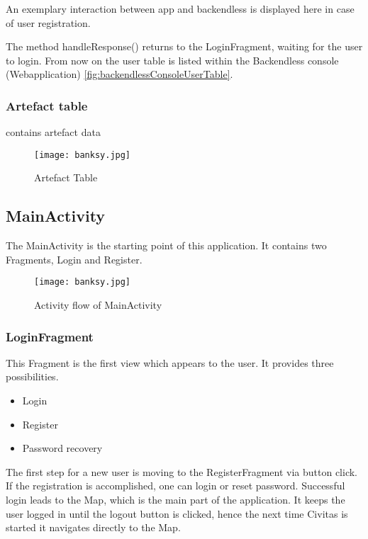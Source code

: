 An exemplary interaction between app and backendless is displayed here in case of user registration.

\fbox{

}

The method handleResponse() returns to the LoginFragment, waiting for the user to login. From now on the user table is listed within the Backendless console (Webapplication) \ref{fig:backendlessConsoleUserTable}.


\subsubsection{Artefact table}
contains artefact data

\begin{figure}[H]
	\centering \texttt{[image: banksy.jpg]}
	\caption[ArtefactTable]{Artefact Table\footnotemark}
	\label{fig:Banksy}
\end{figure}


\subsection{MainActivity}
The MainActivity is the starting point of this application. It contains two Fragments, Login and Register. 

\begin{figure}[H]
	\centering \texttt{[image: banksy.jpg]}
	\caption[MainActivity]{Activity flow of MainActivity\footnotemark}
	\label{fig:MainActivity}
\end{figure}

\subsubsection{LoginFragment}
This Fragment is the first view which appears to the user. It provides three possibilities. 
\begin{itemize}
\item Login
\item Register
\item Password recovery
\end{itemize}
The first step for a new user is moving to the RegisterFragment via button click.
If the registration is accomplished, one can login or reset password.
Successful login leads to the Map, which is the main part of the application. It keeps the user logged in until the logout button is clicked, hence the next time Civitas is started it navigates directly to the Map.

